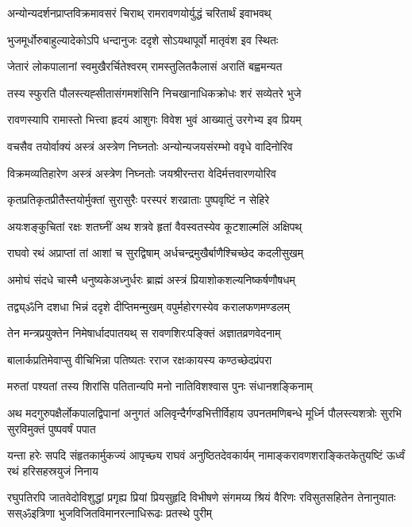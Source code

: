 \twolineshloka
{अन्योन्यदर्शनप्राप्तविक्रमावसरं चिराथ्}
{रामरावणयोर्युद्धं चरितार्थं इवाभवथ्}%

\twolineshloka
{भुजमूर्धोरुबाहुल्यादेकोऽपि धन्दानुजः}
{ददृशे सोऽयथापूर्वो मातृवंश इव स्थितः}%

\twolineshloka
{जेतारं लोकपालानां स्वमुखैरर्चितेश्वरम्}
{रामस्तुलितकैलासं अरातिं बह्वमन्यत}%

\twolineshloka
{तस्य स्फुरति पौलस्त्यह्सीतासंगमशंसिनि}
{निचखानाधिकक्रोधः शरं सव्येतरे भुजे}%

\twolineshloka
{रावणस्यापि रामास्तो भित्त्वा हृदयं आशुगः}
{विवेश भुवं आख्यातुं उरगेभ्य इव प्रियम्}%

\twolineshloka
{वचसैव तयोर्वाक्यं अस्त्रं अस्त्रेण निघ्नतोः}
{अन्योन्यजयसंरम्भो ववृधे वादिनोरिव}%

\twolineshloka
{विक्रमव्यतिहारेण अस्त्रं अस्त्रेण निघ्नतोः}
{जयश्रीरन्तरा वेदिर्मत्तवारणयोरिव}%

\twolineshloka
{कृतप्रतिकृतप्रीतैस्तयोर्मुक्तां सुरासुरैः}
{परस्परं शरव्राताः पुष्पवृष्टिं न सेहिरे}%

\twolineshloka
{अयःशङ्कुचितां रक्षः शतघ्नीं अथ शत्रवे}
{हृतां वैवस्वतस्येव कूटशाल्मलिं अक्षिपथ्}%

\twolineshloka
{राघवो रथं अप्राप्तां तां आशां च सुरद्विषाम्}
{अर्धचन्द्रमुखैर्बाणैश्चिच्छेद कदलीसुखम्}%

\twolineshloka
{अमोघं संदधे चास्मै धनुष्यकेअध्नुर्धरः}
{ब्राह्मं अस्त्रं प्रियाशोकशल्यनिष्कर्षणौषधम्}%

\twolineshloka
{तद्व्य्ॐनि दशधा भिन्नं ददृशे दीप्तिमन्मुखम्}
{वपुर्महोरगस्येव करालफणमण्डलम्}%

\twolineshloka
{तेन मन्त्रप्रयुक्तेन निमेषार्धादपातयथ्}
{स रावणशिरःपङ्क्तिं अज्ञातव्रणवेदनाम्}%

\twolineshloka
{बालार्कप्रतिमेवाप्सु वीचिभिन्ना पतिष्यतः}
{रराज रक्षःकायस्य कण्ठच्छेदप्रंपरा}%

\twolineshloka
{मरुतां पश्यतां तस्य शिरांसि पतितान्यपि}
{मनो नातिविशश्वास पुनः संधानशङ्किनाम्}%

\twolineshloka
{अथ मदगुरुपक्षैर्लोकपालद्विपानां अनुगतं अलिवृन्दैर्गण्डभित्तीर्विहाय}
{उपनतमणिबन्धे मूर्ध्नि पौलस्त्यशत्रोः सुरभि सुरविमुक्तं पुष्पवर्षं पपात}%

\twolineshloka
{यन्ता हरेः सपदि संहृतकार्मुकज्यं आपृच्छ्य राघवं अनुष्ठितदेवकार्यम्}
{नामाङ्करावणशराङ्कितकेतुयष्टिं ऊर्ध्वं रथं हरिसहस्रयुजं निनाय}%

\twolineshloka
{रघुपतिरपि जातवेदोविशुद्धां प्रगृह्य प्रियां प्रियसुहृदि विभीषणे संगमय्य श्रियं वैरिणः}
{रविसुतसहितेन तेनानुयातः सस्ॐइत्रिणा भुजविजितविमानरत्नाधिरूढः प्रतस्थे पुरीम्}%

